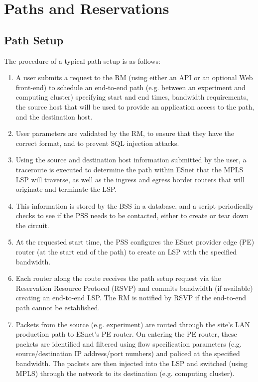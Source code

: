 \documentclass[conference]{IEEEtran}
\begin{document}
\section{Paths and Reservations}

\subsection{Path Setup}

The procedure of a typical path setup is as follows:

\begin{enumerate}
\item
A user submits a request to the RM (using either an API or
an optional Web front-end) to schedule an end-to-end path (e.g. between an
experiment and computing cluster) specifying start and end times, bandwidth
requirements, the source host that will be used 
to provide an application access to the path, and the destination host.

\item
User parameters are validated by the RM, to ensure that they have the
correct format, and to prevent SQL injection attacks.

\item
Using the source and destination host information submitted by the user,
a traceroute is executed to determine the path within ESnet that the
MPLS LSP will traverse, as well as the ingress and egress border routers
that will originate and terminate the LSP.

\item
This information is stored by the BSS in a database, and a script 
periodically checks to see if the PSS needs to be contacted, either to create 
or tear down the circuit.

\item
At the requested start time, the PSS configures the 
ESnet provider edge (PE) router
(at the start end of the path) to create an LSP with the
specified bandwidth.

\item
Each router along the route receives the path setup request 
via the Reservation Resource Protocol (RSVP) \cite{rsvp}
and commits bandwidth (if available) creating an end-to-end LSP.  The RM is
notified by RSVP if the end-to-end path cannot be established.

\item
Packets from the source (e.g. experiment) are routed through the site's
LAN production path to ESnet's PE router.  On entering the PE router,
these packets are identified and filtered using flow specification parameters
(e.g. source/destination IP address/port numbers) and policed at the specified
bandwidth.  The packets are then injected into the LSP and switched (using MPLS)
through the network to its destination (e.g. computing cluster).


\end{enumerate}
\end{document}
